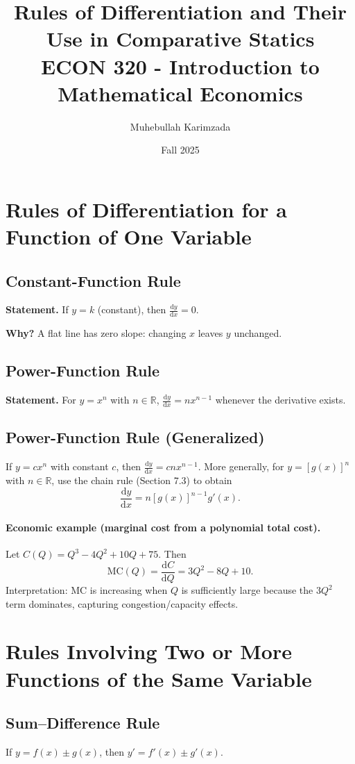 \documentclass[11pt]{article}
\title{Rules of Differentiation and Their Use in Comparative Statics\\ \vspace{.5cm}
\large ECON 320 - Introduction to Mathematical Economics}
\author{Muhebullah Karimzada}
\date{Fall 2025}
\newcommand{\R}{\mathbb{R}}
\newcommand{\dtotal}[2]{\frac{\mathrm{d} #1}{\mathrm{d} #2}}
\begin{document}
\maketitle
\tableofcontents

\newpage
\section{ Rules of Differentiation for a Function of One Variable}

\subsection*{Constant-Function Rule}
\textbf{Statement.} If $y=k$ (constant), then $\dtotal{y}{x}=0$.
\medskip

\textbf{Why?} A flat line has zero slope: changing $x$ leaves $y$ unchanged.

\subsection*{Power-Function Rule}
\textbf{Statement.} For $y=x^n$ with $n\in\R$, $\dtotal{y}{x}=n x^{n-1}$ whenever the derivative exists.



\subsection*{Power-Function Rule (Generalized)}
If $y=c x^{n}$ with constant $c$, then $\dtotal{y}{x}=c n x^{n-1}$. More generally, for $y=[g(x)]^n$ with $n\in\R$, use the chain rule (Section 7.3) to obtain
\[
\dtotal{y}{x}= n [g(x)]^{n-1} g'(x).
\]

\paragraph{Economic example (marginal cost from a polynomial total cost).}
Let $C(Q)=Q^3-4Q^2+10Q+75$. Then
\[
\mathrm{MC}(Q)=\dtotal{C}{Q}=3Q^2-8Q+10.
\]
Interpretation: MC is increasing when $Q$ is sufficiently large because the $3Q^2$ term dominates, capturing congestion/capacity effects.

\section{Rules Involving Two or More Functions of the Same Variable}

\subsection*{Sum--Difference Rule}
If $y=f(x)\pm g(x)$, then $y'=f'(x)\pm g'(x)$.
\medskip
\end{document}
